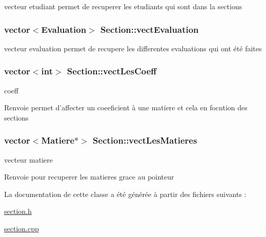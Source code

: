 vecteur etudiant permet de recuperer les etudiants qui sont dans la sections 

\hypertarget{class_section_a2c07b1c98085111f120142cbe087fd36}{
\subsubsection[{vect\+Evaluation}]{\setlength{\rightskip}{0pt plus 5cm}vector$<${\bf Evaluation}$>$ Section\+::vect\+Evaluation\hspace{0.3cm}{\ttfamily [private]}}}\label{class_section_a2c07b1c98085111f120142cbe087fd36}


vecteur evaluation permet de recupere les differentes evaluations qui ont été faites 

\hypertarget{class_section_a189240ee9f2d58c63be99a7c65e9ec4f}{
\subsubsection[{vect\+Les\+Coeff}]{\setlength{\rightskip}{0pt plus 5cm}vector$<$int$>$ Section\+::vect\+Les\+Coeff\hspace{0.3cm}{\ttfamily [private]}}}\label{class_section_a189240ee9f2d58c63be99a7c65e9ec4f}


coeff 

\begin{DoxyReturn}{Renvoie}
permet d'affecter un coeeficient à une matiere et cela en focntion des sections 
\end{DoxyReturn}
\hypertarget{class_section_ac7febeae3b093a5cac9e9df3a7474fe4}{
\subsubsection[{vect\+Les\+Matieres}]{\setlength{\rightskip}{0pt plus 5cm}vector$<${\bf Matiere}$\ast$$>$ Section\+::vect\+Les\+Matieres\hspace{0.3cm}{\ttfamily [private]}}}\label{class_section_ac7febeae3b093a5cac9e9df3a7474fe4}


vecteur matiere 

\begin{DoxyReturn}{Renvoie}
pour recuperer les matieres grace au pointeur 
\end{DoxyReturn}


La documentation de cette classe a été générée à partir des fichiers suivants \+:\begin{DoxyCompactItemize}
\item 
\hyperlink{section_8h}{section.\+h}\item 
\hyperlink{section_8cpp}{section.\+cpp}\end{DoxyCompactItemize}

